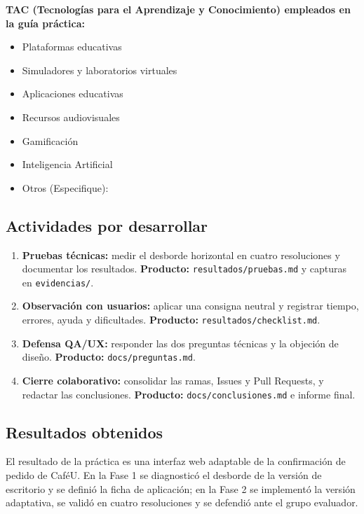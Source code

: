 \documentclass{article}
\begin{document}
\textbf{TAC (Tecnologías para el Aprendizaje y Conocimiento) empleados en la guía práctica:}
\begin{itemize}
    \item[$\square$] Plataformas educativas
    \item[$\square$] Simuladores y laboratorios virtuales
    \item[$\square$] Aplicaciones educativas
    \item[$\square$] Recursos audiovisuales
    \item[$\square$] Gamificación
    \item[$\blacksquare$] Inteligencia Artificial
    \item Otros (Especifique): \underline{\hspace{5cm}}
\end{itemize}

\subsection{Actividades por desarrollar}
\begin{enumerate}
    \item \textbf{Pruebas técnicas:} medir el desborde horizontal en cuatro resoluciones y documentar los resultados. \textbf{Producto:} \texttt{resultados/pruebas.md} y capturas en \texttt{evidencias/}.
    \item \textbf{Observación con usuarios:} aplicar una consigna neutral y registrar tiempo, errores, ayuda y dificultades. \textbf{Producto:} \texttt{resultados/checklist.md}.
    \item \textbf{Defensa QA/UX:} responder las dos preguntas técnicas y la objeción de diseño. \textbf{Producto:} \texttt{docs/preguntas.md}.
    \item \textbf{Cierre colaborativo:} consolidar las ramas, Issues y Pull Requests, y redactar las conclusiones. \textbf{Producto:} \texttt{docs/conclusiones.md} e informe final.
\end{enumerate}

\subsection{Resultados obtenidos}
El resultado de la práctica es una interfaz web adaptable de la confirmación de pedido de CaféU. En la Fase 1 se diagnosticó el desborde de la versión de escritorio y se definió la ficha de aplicación; en la Fase 2 se implementó la versión adaptativa, se validó en cuatro resoluciones y se defendió ante el grupo evaluador.
\end{document}
